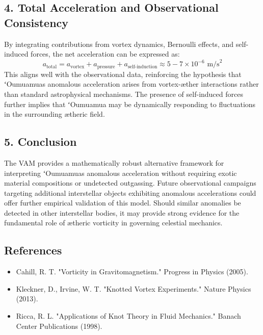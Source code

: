     \subsection*{4. Total Acceleration and Observational Consistency}
    By integrating contributions from vortex dynamics, Bernoulli effects, and self-induced forces, the net acceleration can be expressed as:
    \begin{equation*}
        a_\text{total} = a_\text{vortex} + a_\text{pressure} + a_\text{self-induction} \approx 5 - 7 \times 10^{-6} \text{ m/s}^2
    \end{equation*}
    This aligns well with the observational data, reinforcing the hypothesis that ʻOumuamua\rqs s anomalous acceleration arises from vortex-æther interactions rather than standard astrophysical mechanisms. The presence of self-induced forces further implies that ʻOumuamua may be dynamically responding to fluctuations in the surrounding ætheric field.

    \subsection*{5. Conclusion}
    The VAM provides a mathematically robust alternative framework for interpreting ʻOumuamua\rqs s anomalous acceleration without requiring exotic material compositions or undetected outgassing. Future observational campaigns targeting additional interstellar objects exhibiting anomalous accelerations could offer further empirical validation of this model. Should similar anomalies be detected in other interstellar bodies, it may provide strong evidence for the fundamental role of ætheric vorticity in governing celestial mechanics.

    \subsection*{References}
    \begin{itemize}
        \item Cahill, R. T. "Vorticity in Gravitomagnetism." Progress in Physics (2005).
        \item Kleckner, D., Irvine, W. T. "Knotted Vortex Experiments." Nature Physics (2013).
        \item Ricca, R. L. "Applications of Knot Theory in Fluid Mechanics." Banach Center Publications (1998).
    \end{itemize}


